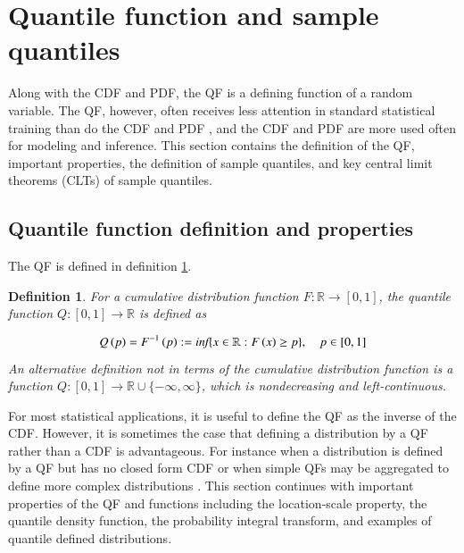 \documentclass[preprint,12pt,authoryear]{elsarticle}
\newtheorem{definition}{Definition}
\newcommand{\1}[1]{\mathds{1}\left[#1\right]}
\newcommand{\jarad}[1]{{\color{red} ?? Jarad: #1}}
\begin{document}
\section{Quantile function and sample quantiles} \label{sec:quant_func}


Along with the CDF and PDF, the QF is a defining function of a random variable. 
The QF, however, often receives less attention in standard statistical 
training than do the CDF and PDF \cite[]{parzen2004quantile}, and the CDF and 
PDF are more used often for modeling and inference.
This section contains the definition of the QF, important properties, the 
definition of sample quantiles, and key central limit theorems (CLTs) of sample 
quantiles.

\subsection{Quantile function definition and properties}

The QF is defined in definition \ref{def:qf}.


\begin{definition}
    \label{def:qf}
    For a cumulative distribution function $F: \mathbb{R} \rightarrow 
    \left[ 0,1 \right]$, 
    the quantile function $Q: \left[0,1\right] 
    \rightarrow \mathbb{R}$ is defined as 
    
    \begin{equation*}
    \label{eq:qf}
        Q\left(p\right) = F^{-1}\left(p\right) := 
        \emph{inf}\{x \in \mathbb{R} : F\left(x\right) \geq p\}, 
        \quad p \in \left[0,1\right]
    \end{equation*}
    An alternative definition not in terms of the cumulative distribution 
    function is a function 
    $Q: \left[0,1\right] \rightarrow \mathbb{R} \cup \{-\infty, \infty\}$, which is 
    nondecreasing and left-continuous. 
\end{definition}

For most statistical applications, it is useful to define the QF as the inverse 
of the CDF. However, it is sometimes the case that defining a distribution by 
a QF rather than a CDF is advantageous. For instance when a distribution is 
defined by a 
QF but has no closed form CDF or when simple QFs may be aggregated to define 
more complex distributions 
\cite[]{perepolkin2023tenets, gasthaus2019probabilistic, alvarez2023quantile}. 
This section continues with important properties of the QF and functions 
including the location-scale property, the quantile density function, the 
probability integral transform, and examples of quantile defined distributions.
\end{document}
